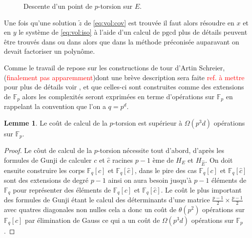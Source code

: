 \documentclass[10pt,a4paper]{book}
\theoremstyle{plain}
\theoremstyle{definition}
\newtheorem{lem}[thm]{Lemme}
\theoremstyle{definition}
\theoremstyle{definition}
\theoremstyle{definition}
\theoremstyle{remark}
\theoremstyle{remark}
\theoremstyle{definition}
\begin{document}
\begin{figure}
\begin{center}
\label{fig:dra:des}
\caption{Descente d'un point de $p$-torsion sur $E$.}
\end{center}
\end{figure}

Une fois qu'une solution $\tilde{z}$ de \eqref{eq:vol:cov}
est trouvée il faut alors résoudre en $x$ et en $y$ le système de 
\eqref{eq:vol:iso} à l'aide d'un calcul de $\mathrm{pgcd}$ plus de détails 
peuvent être trouvés dans \cite[§6.2]{Ler97a} ou dans \cite[§7]{DeFeo11} alors 
que dans la méthode préconisée auparavant on devait factoriser un polynôme.

Comme le travail de \cite{DeFeo11} repose sur les constructions de tour d'Artin Schreier, (\textcolor{red}{finalement pas apparemment})dont une brève description sera faite \textcolor{red}{ref. à mettre} pour plus de détails voir \cite{DeFeo-Shost'12}, et que celles-ci sont construites comme des extensions de $\mathbb{F}_p$ alors les complexités seront exprimées en terme d'opérations sur $\mathbb{F}_p$ en rappelant la convention que l'on a $q=p^d$.

\begin{lem}
Le coût de calcul de la $p$-torsion est supérieur à  $\Omega(p^3d)$ opérations sur $\mathbb{F}_p$.
\end{lem}

\begin{proof}
Le côut de calcul de la $p$-torsion nécessite tout d'abord, d'après les formules de Gunji de calculer $c$ et $\widehat{c}$ racines $p-1$ ème de $H_{E}$ et $H_{\widehat{E}}$. On doit ensuite construire les corps $\mathbb{F}_q[c]$ et $\mathbb{F}_q[\widehat{c}]$, dans le pire des cas $\mathbb{F}_q[c]$ et $\mathbb{F}_q[\widehat{c}]$ sont des extensions de degré $p-1$ ainsi on aura besoin jusqu'à $p-1$ éléments de $\mathbb{F}_q$ pour représenter des éléments de $\mathbb{F}_q[c]$ et $\mathbb{F}_q[\widehat{c}]$. Le coût le plus important des formules de Gunji étant le calcul des déterminants d'une matrice $\frac{p-1}{2} \times \frac{p-1}{2}$ avec quatres diagonales non nulles cela a donc un coût de $\theta(p^2)$ opérations sur $\mathbb{F}_q[c]$ par élimination de Gauss ce qui a un coût de $\Omega(p^3d)$ opérations sur $\mathbb{F}_p$.
\end{proof}
\end{document}
